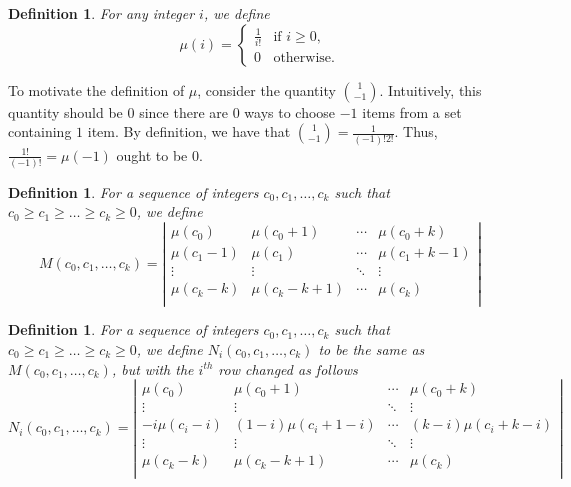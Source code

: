\documentclass[12pt]{amsart}
\newtheorem{definition}[theorem]{Definition}
\newcommand{\ifact}{\mu}
\newcommand{\M}{M}
\newcommand{\N}{N}
\begin{document}
\begin{definition}
For any integer $i$, we define
$$
\ifact(i) = 
\begin{cases}
\frac{1}{i!} & \text{if } i \geq 0, \\
0 & \text{otherwise.}
\end{cases}
$$
\end{definition}

To motivate the definition of $\ifact$, consider the quantity $\binom{1}{-1}$. Intuitively, this quantity should be $0$ since there are $0$ ways to choose $-1$ items from a set containing $1$ item. By definition, we have that $\binom{1}{-1} = \frac{1}{(-1)!2!}$. Thus, $\frac{1!}{(-1)!} = \ifact(-1)$ ought to be $0$.

\begin{definition}
For a sequence of integers $c_0, c_1, \dots, c_k$ such that $c_0 \geq c_1 \geq \dots \geq c_k \geq 0$, we define
$$
\M(c_0, c_1, \dots, c_k) = \left|
\begin{matrix}
\ifact(c_0) & \ifact(c_0+1) & \cdots & \ifact(c_0+k) \\
\ifact(c_1-1) & \ifact(c_1) & \cdots & \ifact(c_1+k-1) \\
\vdots & \vdots & \ddots & \vdots \\
\ifact(c_k-k) & \ifact(c_k-k+1) & \cdots & \ifact(c_k) \\
\end{matrix} \right|
$$
\end{definition}

\begin{definition}
For a sequence of integers $c_0, c_1, \dots, c_k$ such that $c_0 \geq c_1 \geq \dots \geq c_k \geq 0$, we define $\N_i(c_0,c_1,\dots,c_k)$ to be the same as $\M(c_0, c_1, \dots, c_k)$, but with the $i^{th}$ row changed as follows
$$
\N_i(c_0, c_1, \dots, c_k) = \left|
\begin{matrix}
\ifact(c_0) & \ifact(c_0+1) & \cdots & \ifact(c_0+k) \\
\vdots & \vdots & \ddots & \vdots \\
-i\ifact(c_i-i) & (1-i)\ifact(c_i + 1 - i) & \cdots & (k-i) \ifact(c_i+k-i) \\
\vdots & \vdots & \ddots & \vdots \\
\ifact(c_k-k) & \ifact(c_k-k+1) & \cdots & \ifact(c_k) \\
\end{matrix} \right|
$$
\end{definition}

\vspace{0.75cm}
\end{document}
